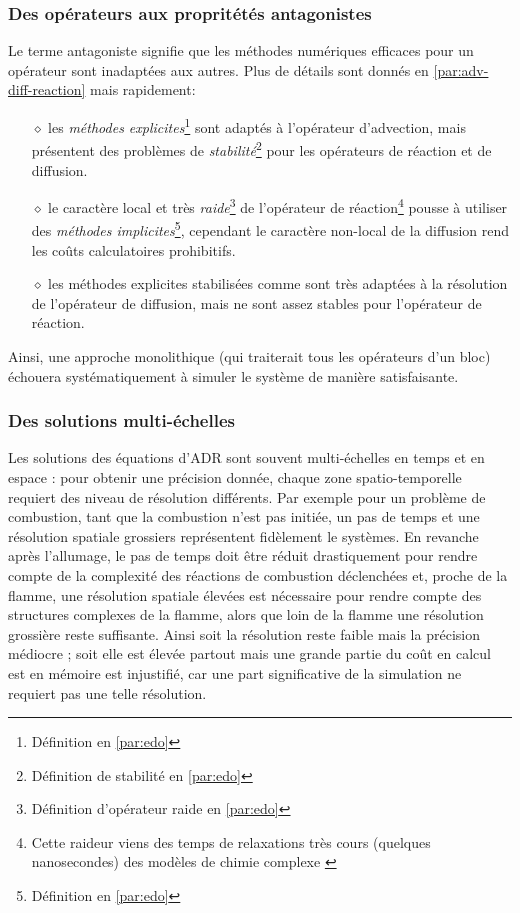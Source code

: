     \subsubsection{Des opérateurs aux propritétés antagonistes}
        Le terme antagoniste signifie que les méthodes numériques efficaces pour un opérateur sont inadaptées aux autres.
        Plus de détails sont donnés en \ref{par:adv-diff-reaction} mais rapidement:
        \begin{itemize}
            \item[$\diamond$] les \textit{méthodes explicites}\footnote{Définition en \ref{par:edo}} sont adaptés à l'opérateur d'advection, 
            mais présentent des problèmes de \textit{stabilité}\footnote{Définition de stabilité en \ref{par:edo}} pour les  opérateurs de réaction et de diffusion.
            \item[$\diamond$] le caractère local et très \textit{raide}\footnote{Définition d'opérateur raide en \ref{par:edo}} de l'opérateur de réaction\footnote{
                Cette raideur viens des temps de relaxations très cours (quelques nanosecondes) des modèles de chimie complexe \cite{Wartha2021}}
            pousse à utiliser des \textit{méthodes implicites}\footnote{Définition en \ref{par:edo}}, cependant le caractère non-local 
            de la diffusion rend les coûts calculatoires prohibitifs.
            \item[$\diamond$] les méthodes explicites stabilisées comme \cite{AbdulleMedovikov2001} sont très adaptées à la résolution de l'opérateur de diffusion, mais 
            ne sont assez stables pour l'opérateur de réaction.
        \end{itemize}
        Ainsi, une approche monolithique (qui traiterait tous les opérateurs d'un bloc) échouera systématiquement à simuler le système de manière satisfaisante.
    \subsubsection{Des solutions multi-échelles}
    Les solutions des équations d'ADR sont souvent multi-échelles en temps et en espace \cite{duart2011} : pour obtenir une précision donnée, chaque zone spatio-temporelle 
    requiert des niveau de résolution différents. Par exemple pour un problème de combustion, tant que la combustion n'est pas initiée, 
    un pas de temps et une résolution spatiale grossiers représentent fidèlement le systèmes. En revanche après l'allumage,
    le pas de temps doit être réduit drastiquement pour rendre compte de la complexité des réactions de combustion déclenchées et,
    proche de la flamme, une résolution spatiale élevées est nécessaire pour rendre compte des structures complexes de la flamme, alors que 
    loin de la flamme une résolution grossière reste suffisante.
    Ainsi soit la résolution reste faible mais la précision médiocre ; 
    soit elle est élevée partout mais une grande partie du coût en calcul est en mémoire est injustifié, 
    car une part significative de la simulation ne requiert pas une telle résolution.

